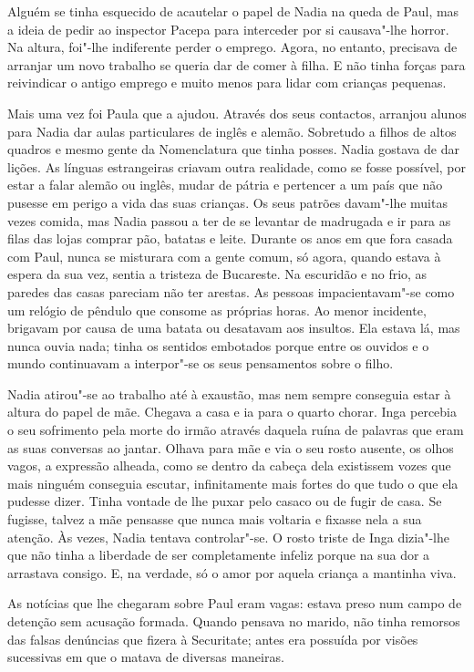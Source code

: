 Alguém se tinha esquecido de acautelar o papel de Nadia na queda de
Paul, mas a ideia de pedir ao inspector Pacepa para interceder por si
causava"-lhe horror. Na altura, foi"-lhe indiferente perder o emprego.
Agora, no entanto, precisava de arranjar um novo trabalho se queria dar
de comer à filha. E não tinha forças para reivindicar o antigo emprego e
muito menos para lidar com crianças pequenas.

Mais uma vez foi Paula que a ajudou. Através dos seus contactos,
arranjou alunos para Nadia dar aulas particulares de inglês e alemão.
Sobretudo a filhos de altos quadros e mesmo gente da Nomenclatura que
tinha posses. Nadia gostava de dar lições. As línguas estrangeiras criavam outra realidade, como se fosse possível, por estar a falar alemão ou
inglês, mudar de pátria e pertencer a um país que não pusesse em perigo
a vida das suas crianças. Os seus patrões davam"-lhe muitas vezes comida,
mas Nadia passou a ter de se levantar de madrugada e ir para as filas
das lojas comprar pão, batatas e leite. Durante os anos em que fora
casada com Paul, nunca se misturara com a gente comum, só agora, quando
estava à espera da
sua vez, sentia a tristeza de Bucareste. Na escuridão e no frio, as
paredes das casas pareciam não ter arestas. As pessoas
impacientavam"-se como um relógio de pêndulo que consome as próprias
horas. Ao menor incidente, brigavam por causa de uma batata ou desatavam
aos insultos. Ela estava lá, mas nunca ouvia nada; tinha os sentidos
embotados porque entre os ouvidos e o mundo continuavam a interpor"-se
os seus pensamentos sobre o filho.

Nadia atirou"-se ao trabalho até à exaustão, mas nem sempre conseguia
estar à altura do papel de mãe. Chegava a casa e ia para o quarto
chorar. Inga percebia o seu sofrimento pela morte do irmão através
daquela ruína de palavras que eram as suas conversas ao jantar. Olhava
para mãe e via o seu rosto ausente, os olhos vagos, a expressão alheada,
como se dentro da cabeça dela existissem vozes que mais ninguém
conseguia escutar, infinitamente mais fortes do que tudo o que ela
pudesse dizer. Tinha vontade de lhe puxar pelo casaco ou de fugir de
casa. Se fugisse, talvez a mãe pensasse que nunca mais voltaria e
fixasse nela a sua atenção. Às vezes, Nadia tentava controlar"-se. O
rosto triste de Inga dizia"-lhe que não tinha a liberdade de ser
completamente infeliz porque na sua dor a arrastava consigo. E, na
verdade, só o amor por aquela criança a mantinha viva.

As notícias que lhe chegaram sobre Paul eram vagas:
estava preso num campo de detenção sem acusação formada. Quando
pensava no marido, não tinha remorsos das falsas denúncias que fizera à
Securitate; antes era possuída por visões sucessivas em que o matava de
diversas maneiras.

